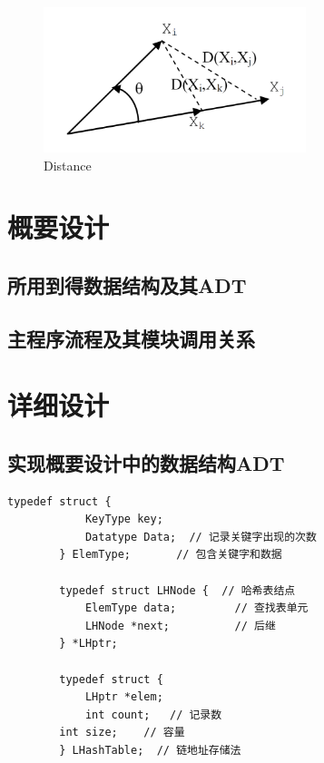 \documentclass[a4paper]{article}
\begin{document}
	\begin{figure}[htbp]
		\centering
		\includegraphics[height=120pt]{D}
		\caption{Distance}
	\end{figure}



	\section{概要设计}\label{sec:design1}

	\subsection{所用到得数据结构及其ADT}\label{subsec:adt}

	\subsection{主程序流程及其模块调用关系}\label{subsec:relate}


	\section{详细设计}\label{sec:design2}

	\subsection{实现概要设计中的数据结构ADT}\label{subsec:adt2}
	\begin{lstlisting}[caption={},label={lst:lstlisting}]
        typedef struct {
            KeyType key;
            Datatype Data;  // 记录关键字出现的次数
        } ElemType;       // 包含关键字和数据

        typedef struct LHNode {  // 哈希表结点
            ElemType data;         // 查找表单元
            LHNode *next;          // 后继
        } *LHptr;

        typedef struct {
            LHptr *elem;
            int count;   // 记录数
        int size;    // 容量
        } LHashTable;  // 链地址存储法
	\end{lstlisting}
\end{document}

